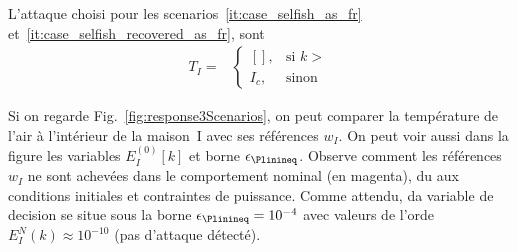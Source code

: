 \documentclass[../main.tex]{subfiles}
\begin{document}
L'attaque choisi pour les scenarios~\ref{it:case_selfish_as_fr} et~\ref{it:case_selfish_recovered_as_fr},
sont
\begin{align}
  T_{I}=&\begin{cases}
          \left[\right],&\text{si }k> \\
          I_{c},&\text{sinon}
        \end{cases}
\end{align}

Si on regarde Fig.~\ref{fig:response3Scenarios}, on peut comparer la température de l'air à l'intérieur de la maison~I
avec ses références $w_{I}$.
On peut voir aussi dans la figure les variables ${E_{I}^{(0)}[k]}$ et borne $\epsilon_{\Plinineq}$.
Observe comment les références $w_{I}$ ne sont achevées dans le comportement nominal (en magenta),
du aux conditions initiales et contraintes de puissance.
Comme attendu, da variable de decision se situe sous la borne ${\epsilon_{\Plinineq}=10^{-4}}$ avec valeurs de l'orde ${E_{I}^{N}(k)\approx10^{-10}}$ (pas d'attaque détecté).
\end{document}
